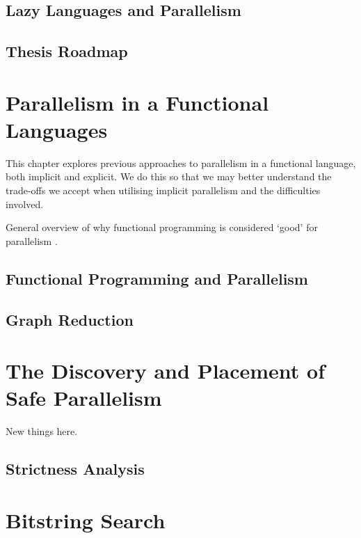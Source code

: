 \documentclass[justified]{tufte-book}
\begin{document}
    \section{Lazy Languages and Parallelism}


    \section{Thesis Roadmap}

\chapter{Parallelism in a Functional Languages}

    This chapter explores previous approaches to parallelism in a
    functional language, both implicit and explicit. We do this so that
    we may better understand the trade-offs we accept when utilising
    implicit parallelism and the difficulties involved.


    General overview of why functional programming is considered `good' for
    parallelism \citep{hughes:thesis}.
    \section{Functional Programming and Parallelism}
    
    
    \section{Graph Reduction}
    

\chapter{The Discovery and Placement of Safe Parallelism}

    New things here.
    \section{Strictness Analysis}
    
    
\chapter{Bitstring Search}
\end{document}
